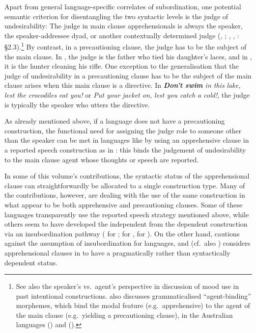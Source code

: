 \documentclass[output=paper,colorlinks,citecolor=brown]{langscibook}
\begin{document}
Apart from general language-specific correlates of subordination, one potential semantic criterion for disentangling the two syntactic levels is the judge of undesirability: The judge in main clause apprehensionals is always the speaker, the speaker-addressee dyad, or another contextually determined judge (\cite[164--170]{green1989},  \citealt{chapters/fedotov}; \citealt{chapters/francois}, \cite[272--273]{vuillermet2018a}, \citealt{chapters/vuillermet}: \S2.3).\footnote {See also the speaker's vs.\ agent's perspective in  discussion of mood use in past intentional constructions. \citet[68--69]{verstraete2006a} also discusses grammaticalised ``agent-binding'' morphemes, which bind the modal feature (e.g.\ apprehensive) to the agent of the main clause (e.g.\ yielding a precautioning clause), in the Australian languages  () and  ().} By contrast, in a precautioning clause, the judge has to be the subject of the main clause. In , the judge is the father who tied his daughter's laces, and in , it is the hunter cleaning his rifle. One exception to the generalisation that the judge of undesirability in a precautioning clause has to be the subject of the main clause arises when this main clause is a directive. In \textit{\textbf{Don't swim}  in this lake, lest the crocodiles eat you!} or \textit{Put your jacket on, lest you catch a cold!}, the judge is typically the speaker who utters the directive.

As already mentioned above, if a language does not have a precautioning construction, the functional need for assigning the judge role to someone other than the speaker can be met in languages like  by using an apprehensive clause in a reported speech construction as in : this binds the judgement of undesirability to the main clause agent whose thoughts or speech are reported. 

In some of this volume's contributions, the syntactic status of the apprehensional clause can straightforwardly be allocated to a single construction type. Many of the contributions, however, are dealing with the use of the same construction in what appear to be both apprehensive and precautioning clauses. Some of these languages transparently use the reported speech strategy mentioned above, while others seem to have developed the independent from the dependent construction via an insubordination pathway (\citeauthor{chapters/dabkowski-anderbois} for ; \citeauthor{chapters/daniel}  for , \citeauthor{chapters/francez} for ). On the other hand, \citeauthor{chapters/wiemer} cautions against the assumption of insubordination for  languages, and \citeauthor{chapters/francois}  (cf.\ also \cite{francois2003}) considers apprehensional clauses in  to have a pragmatically rather than syntactically dependent status.
\end{document}
